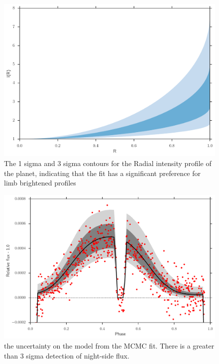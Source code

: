 \documentclass[a4paper,fleqn,usenatbib]{mnras}
\begin{document}
\begin{figure}
\begin{center}
\includegraphics[width=\columnwidth]{img/ld_prof.pdf}
\caption{The 1 sigma and 3 sigma contours for the Radial intensity profile of the planet, indicating that the fit has a significant preference for limb brightened profiles }
\label{fig:limb brighten}
\end{center}
\end{figure}

\begin{figure}
\begin{center}
\includegraphics[width=\columnwidth]{img/model.pdf}
\caption{the uncertainty on the model from the MCMC fit. There is a greater than 3 sigma detection of night-side flux.}
\label{fig:model}
\end{center}
\end{figure}
\end{document}
